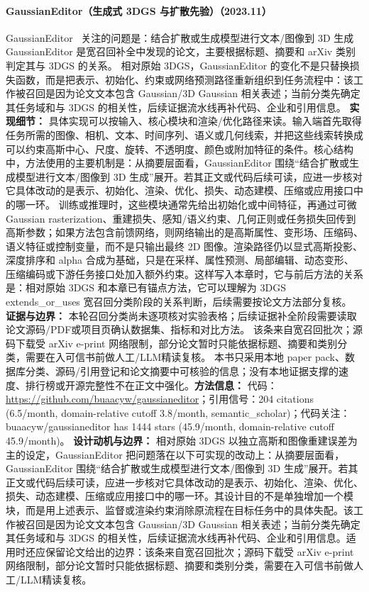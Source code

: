 \paragraph{GaussianEditor（生成式 3DGS 与扩散先验）（2023.11）}
GaussianEditor~\cite{2311_16037} 关注的问题是：结合扩散或生成模型进行文本/图像到 3D 生成 GaussianEditor 是宽召回补全中发现的论文，主要根据标题、摘要和 arXiv 类别判定其与 3DGS 的关系。
相对原始 3DGS，GaussianEditor 的变化不是只替换损失函数，而是把表示、初始化、约束或网络预测路径重新组织到任务流程中：该工作被召回是因为论文文本包含 Gaussian/3D Gaussian 相关表述；当前分类先确定其任务域和与 3DGS 的相关性，后续证据流水线再补代码、企业和引用信息。
\textbf{实现细节：} 具体实现可以按输入、核心模块和渲染/优化路径来读。输入端首先取得任务所需的图像、相机、文本、时间序列、语义或几何线索，并把这些线索转换成可以约束高斯中心、尺度、旋转、不透明度、颜色或附加特征的条件。核心结构中，方法使用的主要机制是：从摘要层面看，GaussianEditor 围绕“结合扩散或生成模型进行文本/图像到 3D 生成”展开。若其正文或代码后续可读，应进一步核对它具体改动的是表示、初始化、渲染、优化、损失、动态建模、压缩或应用接口中的哪一环。 训练或推理时，这些模块通常先给出初始化或中间特征，再通过可微 Gaussian rasterization、重建损失、感知/语义约束、几何正则或任务损失回传到高斯参数；如果方法包含前馈网络，则网络输出的是高斯属性、变形场、压缩码、语义特征或控制变量，而不是只输出最终 2D 图像。渲染路径仍以显式高斯投影、深度排序和 alpha 合成为基础，只是在采样、属性预测、局部编辑、动态变形、压缩编码或下游任务接口处加入额外约束。这样写入本章时，它与前后方法的关系是：相对原始 3DGS 和本章已有锚点方法，它可以理解为 3DGS extends\_or\_uses 宽召回分类阶段的关系判断，后续需要按论文方法部分复核。
\textbf{证据与边界：} 本轮召回分类尚未逐项核对实验表格；后续证据补全阶段需要读取论文源码/PDF或项目页确认数据集、指标和对比方法。 该条来自宽召回批次；源码下载受 arXiv e-print 网络限制，部分论文暂时只能依据标题、摘要和类别分类，需要在入可信书前做人工/LLM精读复核。 本书只采用本地 paper pack、数据库分类、源码/引用登记和论文摘要中可核验的信息；没有本地证据支撑的速度、排行榜或开源完整性不在正文中强化。\textbf{方法信息：} 代码：\url{https://github.com/buaacyw/gaussianeditor}；引用信号：204 citations (6.5/month, domain-relative cutoff 3.8/month, semantic\_scholar)；代码关注：buaacyw/gaussianeditor has 1444 stars (45.9/month, domain-relative cutoff 45.9/month)。
\textbf{设计动机与边界：} 相对原始 3DGS 以独立高斯和图像重建误差为主的设定，GaussianEditor 把问题落在以下可实现的改动上：从摘要层面看，GaussianEditor 围绕“结合扩散或生成模型进行文本/图像到 3D 生成”展开。若其正文或代码后续可读，应进一步核对它具体改动的是表示、初始化、渲染、优化、损失、动态建模、压缩或应用接口中的哪一环。其设计目的不是单独增加一个模块，而是用上述表示、监督或渲染约束消除原流程在目标任务中的具体失配。该工作被召回是因为论文文本包含 Gaussian/3D Gaussian 相关表述；当前分类先确定其任务域和与 3DGS 的相关性，后续证据流水线再补代码、企业和引用信息。适用时还应保留论文给出的边界：该条来自宽召回批次；源码下载受 arXiv e-print 网络限制，部分论文暂时只能依据标题、摘要和类别分类，需要在入可信书前做人工/LLM精读复核。
